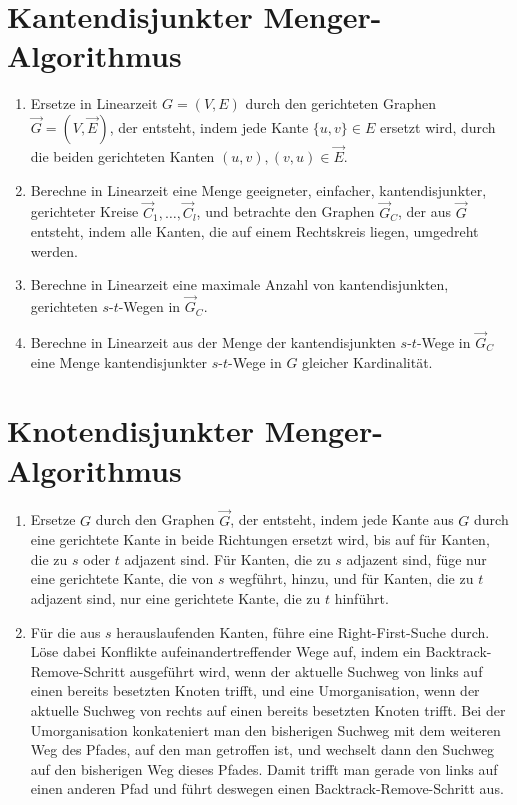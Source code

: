 \documentclass[a4paper,11pt]{report}
\begin{document}
\section{Kantendisjunkter Menger-Algorithmus}
\begin{enumerate}
    \item Ersetze in Linearzeit $G = (V, E)$ durch den gerichteten Graphen $\vec G = (V, \vec E)$, der entsteht, indem jede Kante $\{u, v\} \in E$ ersetzt wird, durch die beiden gerichteten Kanten $(u, v), (v, u) \in \vec E$.
    \item Berechne in Linearzeit eine Menge geeigneter, einfacher, kantendisjunkter, gerichteter Kreise $\vec C_1, \ldots, \vec C_l$, und betrachte den Graphen $\vec G_C$, der aus $\vec G$ entsteht, indem alle Kanten, die auf einem Rechtskreis liegen, umgedreht werden.
    \item Berechne in Linearzeit eine maximale Anzahl von kantendisjunkten, gerichteten $s$-$t$-Wegen in $\vec G_C$.
    \item Berechne in Linearzeit aus der Menge der kantendisjunkten $s$-$t$-Wege in $\vec G_C$ eine Menge kantendisjunkter $s$-$t$-Wege in $G$ gleicher Kardinalität.
\end{enumerate}


\section{Knotendisjunkter Menger-Algorithmus}
\begin{enumerate}
    \item Ersetze $G$ durch den Graphen $\vec G$, der entsteht, indem jede Kante aus $G$ durch eine gerichtete Kante in beide Richtungen ersetzt wird, bis auf für Kanten, die zu $s$ oder $t$ adjazent sind. Für Kanten, die zu $s$ adjazent sind, füge nur eine gerichtete Kante, die von $s$ wegführt, hinzu, und für Kanten, die zu $t$ adjazent sind, nur eine gerichtete Kante, die zu $t$ hinführt.
    \item Für die aus $s$ herauslaufenden Kanten, führe eine Right-First-Suche durch. Löse dabei Konflikte aufeinandertreffender Wege auf, indem ein Backtrack-Remove-Schritt ausgeführt wird, wenn der aktuelle Suchweg von links auf einen bereits besetzten Knoten trifft, und eine Umorganisation, wenn der aktuelle Suchweg von rechts auf einen bereits besetzten Knoten trifft. Bei der Umorganisation konkateniert man den bisherigen Suchweg mit dem weiteren Weg des Pfades, auf den man getroffen ist, und wechselt dann den Suchweg auf den bisherigen Weg dieses Pfades. Damit trifft man gerade von links auf einen anderen Pfad und führt deswegen einen Backtrack-Remove-Schritt aus.
\end{enumerate}
\end{document}
